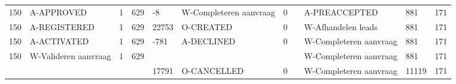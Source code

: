 \begin{tabular}{lllllllllll}
150 & A-APPROVED & 1 & 629 & -8 & W-Completeren aanvraag & 0 &  & A-PREACCEPTED & 881 & 171 \\
150 & A-REGISTERED & 1 & 629 & 22753 & O-CREATED & 0 &  & W-Afhandelen leads & 881 & 171 \\
150 & A-ACTIVATED & 1 & 629 & -781 & A-DECLINED & 0 &  & W-Completeren aanvraag & 881 & 171 \\
150 & W-Valideren aanvraag & 1 & 629 &  &  &  &  & W-Completeren aanvraag & 881 & 171 \\
 &  &  &  & 17791 & O-CANCELLED & 0 &  & W-Completeren aanvraag & 11119 & 171 \\
\bottomrule
\end{tabular}
